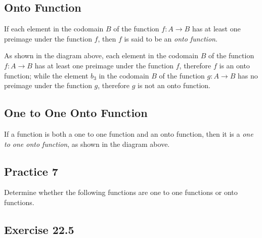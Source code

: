 \documentclass[12pt]{report}
\begin{document}
\subsection*{Onto Function}

If each element in the codomain $B$ of the function $f: A \to B$ has at least
one preimage under the function $f$, then $f$ is said to be an \emph{onto
  function}.

As shown in the diagram above, each element in the codomain $B$ of the function
$f: A \to B$ has at least one preimage under the function $f$, therefore $f$ is
an onto function; while the element $b_3$ in the codomain $B$ of the function
$g: A \to B$ has no preimage under the function $g$, therefore $g$ is not an
onto function.

\subsection*{One to One Onto Function}

If a function is both a one to one function and an onto function, then it is a
\emph{one to one onto function}, as shown in the diagram above.

\subsection*{Practice 7}

Determine whether the following functions are one to one functions or onto
functions.

\subsection*{Exercise 22.5}

\setlength{\columnseprule}{1pt}
\setlength{\columnsep}{24pt}
\end{document}
